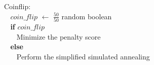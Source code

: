 \begin{tabbing}Coinflip$:$\\
$~~~~$$\textit{coin\_flip}$ $\leftarrow$ \(\frac{50}{50}\) random boolean\\
$~~~~${\bf if} $\textit{coin\_flip}$\\
$~~~~~~~~$Minimize the penalty score\\
$~~~~${\bf else}\\
$~~~~~~~~$Perform the simplified simulated annealing\\
\end{tabbing}